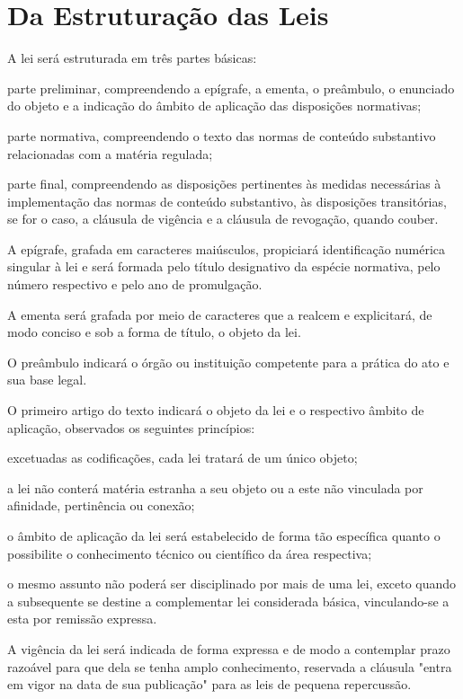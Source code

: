 \documentclass[a5paper,capitulo,titlepage=false]{br-lex}
\begin{document}
\section{Da Estruturação das Leis}

\artigo A lei será estruturada em três partes básicas:


\inciso parte preliminar, compreendendo a epígrafe, a ementa, o preâmbulo, o enunciado do objeto e a indicação do âmbito de aplicação das disposições normativas;

\inciso  parte normativa, compreendendo o texto das normas de conteúdo substantivo relacionadas com a matéria regulada;

\inciso  parte final, compreendendo as disposições pertinentes às medidas necessárias à implementação das normas de conteúdo substantivo, às disposições transitórias, se for o caso, a cláusula de vigência e a cláusula de revogação, quando couber.


\artigo A epígrafe, grafada em caracteres maiúsculos, propiciará identificação numérica singular à lei e será formada pelo título designativo da espécie normativa, pelo número respectivo e pelo ano de promulgação.

\artigo A ementa será grafada por meio de caracteres que a realcem e explicitará, de modo conciso e sob a forma de título, o objeto da lei.

\artigo O preâmbulo indicará o órgão ou instituição competente para a prática do ato e sua base legal.

\artigo O primeiro artigo do texto indicará o objeto da lei e o respectivo âmbito de aplicação, observados os seguintes princípios:


\inciso  excetuadas as codificações, cada lei tratará de um único objeto;

\inciso  a lei não conterá matéria estranha a seu objeto ou a este não vinculada por afinidade, pertinência ou conexão;

\inciso  o âmbito de aplicação da lei será estabelecido de forma tão específica quanto o possibilite o conhecimento técnico ou científico da área respectiva;

\inciso  o mesmo assunto não poderá ser disciplinado por mais de uma lei, exceto quando a subsequente se destine a complementar lei considerada básica, vinculando-se a esta por remissão expressa.


\artigo A vigência da lei será indicada de forma expressa e de modo a contemplar prazo razoável para que dela se tenha amplo conhecimento, reservada a cláusula "entra em vigor na data de sua publicação" para as leis de pequena repercussão.
\end{document}
